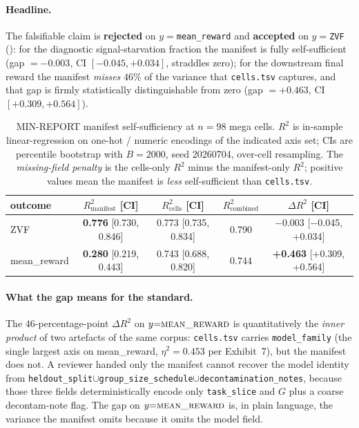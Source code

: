 \paragraph{Headline.}
The falsifiable claim is \textbf{rejected} on
$y{=}$\texttt{mean\_reward} and \textbf{accepted} on $y{=}$\texttt{ZVF}
():
for the diagnostic signal-starvation fraction the manifest is fully
self-sufficient (gap $=-0.003$, CI $[-0.045, +0.034]$, straddles zero);
for the downstream final reward the manifest \emph{misses} $46\%$ of
the variance that \texttt{cells.tsv} captures, and that gap is firmly
statistically distinguishable from zero (gap $=+0.463$, CI
$[+0.309, +0.564]$).

\begin{table}[t]
\centering\small
\caption{MIN-REPORT manifest self-sufficiency at $n{=}98$ mega cells.
$R^2$ is in-sample linear-regression on one-hot / numeric encodings of
the indicated axis set; CIs are percentile bootstrap with
$B{=}2000$, seed 20260704, over-cell resampling. The
\emph{missing-field penalty} is the cells-only $R^2$ minus the
manifest-only $R^2$; positive values mean the manifest is
\emph{less} self-sufficient than \texttt{cells.tsv}.}
\label{tab:p5-manifest-self-suff}
\begin{tabular}{lcccc}
\toprule
outcome & $R^2_\text{manifest}$ [CI] & $R^2_\text{cells}$ [CI] & $R^2_\text{combined}$ & $\Delta R^2$ [CI] \\
\midrule
ZVF          & \textbf{0.776} [0.730, 0.846] & 0.773 [0.735, 0.834] & 0.790 & $-$0.003 [$-$0.045, +0.034] \\
mean\_reward & \textbf{0.280} [0.219, 0.443] & 0.743 [0.688, 0.820] & 0.744 & \textbf{+0.463} [+0.309, +0.564] \\
\bottomrule
\end{tabular}
\end{table}

\paragraph{What the gap means for the standard.}
The 46-percentage-point $\Delta R^2$ on $y{=}\textsc{mean\_reward}$ is
quantitatively the \emph{inner product} of two artefacts of the same
corpus: \texttt{cells.tsv} carries \texttt{model\_family} (the single largest
axis on mean\_reward, $\eta^2{=}0.453$ per Exhibit~7), but the manifest
does not. A reviewer handed only the manifest cannot recover the model
identity from
\texttt{heldout\_split}$\cup$\texttt{group\_size\_schedule}$\cup$\texttt{decontamination\_notes},
because those three fields deterministically encode only
\texttt{task\_slice} and $G$ plus a coarse decontam-note flag. The
gap on $y{=}\textsc{mean\_reward}$ is, in plain language, the variance
the manifest omits because it omits the model field.

